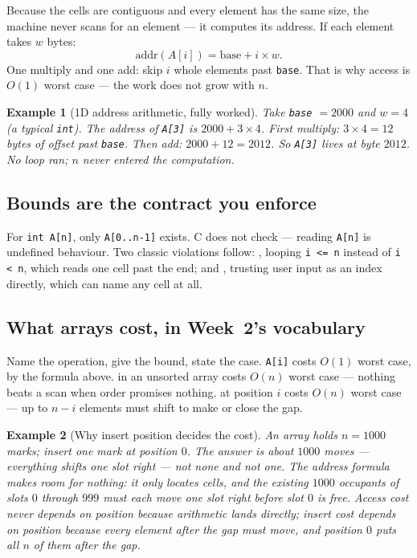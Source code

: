 \documentclass[11pt]{article}
\newtheorem{example}{Example}[section]
\begin{document}
Because the cells are contiguous and every element has the same size, the machine never scans for an element --- it computes its address. If each element takes $w$ bytes:
\[ \text{addr}(A[i]) = \text{base} + i \times w. \]
One multiply and one add: skip $i$ whole elements past \texttt{base}. That is why access is $O(1)$ worst case --- the work does not grow with $n$.

\begin{example}[1D address arithmetic, fully worked]
Take \texttt{base} $= 2000$ and $w = 4$ (a typical \texttt{int}). The address of \texttt{A[3]} is $2000 + 3 \times 4$. First multiply: $3 \times 4 = 12$ bytes of offset past \texttt{base}. Then add: $2000 + 12 = 2012$. So \texttt{A[3]} lives at byte $2012$. No loop ran; $n$ never entered the computation.
\end{example}

\subsection{Bounds are the contract you enforce}

For \texttt{int A[n]}, only \texttt{A[0..n-1]} exists. C does not check --- reading \texttt{A[n]} is undefined behaviour. Two classic violations follow: , looping \texttt{i <= n} instead of \texttt{i < n}, which reads one cell past the end; and , trusting user input as an index directly, which can name any cell at all. 

\subsection{What arrays cost, in Week~2's vocabulary}

Name the operation, give the bound, state the case.  \texttt{A[i]} costs $O(1)$ worst case, by the formula above.  in an unsorted array costs $O(n)$ worst case --- nothing beats a scan when order promises nothing.  at position $i$ costs $O(n)$ worst case --- up to $n - i$ elements must shift to make or close the gap. 

\begin{example}[Why insert position decides the cost]
An array holds $n = 1000$ marks; insert one mark at position $0$. The answer is about $1000$ moves --- everything shifts one slot right --- not none and not one. The address formula makes room for nothing: it only \emph{locates} cells, and the existing $1000$ occupants of slots $0$ through $999$ must each move one slot right before slot $0$ is free. Access cost never depends on position because arithmetic lands directly; insert cost depends on position because every element after the gap must move, and position $0$ puts all $n$ of them after the gap.
\end{example}
\end{document}
